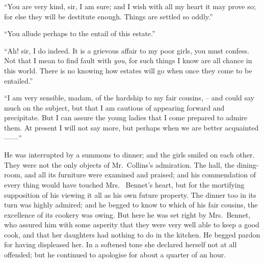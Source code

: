 “You are very kind, sir, I am sure; and I wish with all
my heart it may prove so; for else they will be destitute
enough. Things are settled so oddly.”

“You allude perhaps to the entail of this estate.”

“Ah! sir, I do indeed. It is a grievous affair to my
poor girls, you must confess. Not that I mean to find
fault with \textit{you}, for such things I know are all chance in
this world. There is no knowing how estates will go when
once they come to be entailed.”

“I am very sensible, madam, of the hardship to my
fair cousins, -- and could say much on the subject, but that
I am cautious of appearing forward and precipitate.
But I can assure the young ladies that I come prepared
to admire them. At present I will not say more, but
perhaps when we are better acquainted------”

He was interrupted by a summons to dinner; and the
girls smiled on each other. They were not the only objects
of Mr.\ Collins’s admiration. The hall, the dining-room,
and all its furniture were examined and praised; and his
commendation of every thing would have touched Mrs.\ %
Bennet’s heart, but for the mortifying supposition of his
viewing it all as his own future property. The dinner too
in its turn was highly admired; and he begged to know
to which of his fair cousins, the excellence of its cookery
was owing. But here he was set right by Mrs.\ Bennet,
who assured him with some asperity that they were very
well able to keep a good cook, and that her daughters had
nothing to do in the kitchen. He begged pardon for having
displeased her. In a softened tone she declared herself
not at all offended; but he continued to apologise for
about a quarter of an hour.


